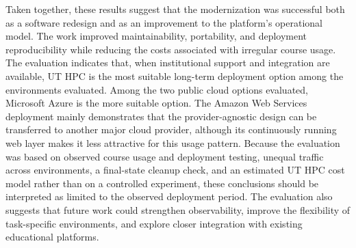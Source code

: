 Taken together, these results suggest that the modernization was successful both as a software redesign and as an improvement to the platform's operational model.
The work improved maintainability, portability, and deployment reproducibility while reducing the costs associated with irregular course usage.
The evaluation indicates that, when institutional support and integration are available, UT HPC is the most suitable long-term deployment option among the environments evaluated.
Among the two public cloud options evaluated, Microsoft Azure is the more suitable option.
The Amazon Web Services deployment mainly demonstrates that the provider-agnostic design can be transferred to another major cloud provider, although its continuously running web layer makes it less attractive for this usage pattern.
Because the evaluation was based on observed course usage and deployment testing, unequal traffic across environments, a final-state cleanup check, and an estimated UT HPC cost model rather than on a controlled experiment, these conclusions should be interpreted as limited to the observed deployment period.
The evaluation also suggests that future work could strengthen observability, improve the flexibility of task-specific environments, and explore closer integration with existing educational platforms.
